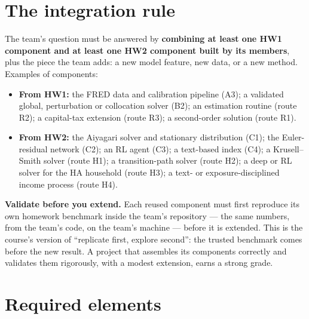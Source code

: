 \documentclass[11pt]{article}
\begin{document}
\section{The integration rule}

The team's question must be answered by \textbf{combining at least one HW1 component and at least
one HW2 component built by its members}, plus the piece the team adds: a new model feature, new
data, or a new method. Examples of components:
\begin{itemize}[leftmargin=*,itemsep=1pt]
  \item \textbf{From HW1:} the FRED data and calibration pipeline (A3); a validated global,
        perturbation or collocation solver (B2); an estimation routine (route R2); a capital-tax
        extension (route R3); a second-order solution (route R1).
  \item \textbf{From HW2:} the Aiyagari solver and stationary distribution (C1); the Euler-residual
        network (C2); an RL agent (C3); a text-based index (C4); a Krusell--Smith solver (route H1);
        a transition-path solver (route H2); a deep or RL solver for the HA household (route H3); a
        text- or exposure-disciplined income process (route H4).
\end{itemize}

\textbf{Validate before you extend.} Each reused component must first reproduce its own homework
benchmark inside the team's repository --- the same numbers, from the team's code, on the team's
machine --- before it is extended. This is the course's version of ``replicate first, explore
second'': the trusted benchmark comes before the new result. A project that assembles its
components correctly and validates them rigorously, with a modest extension, earns a strong grade.

\section{Required elements}
\end{document}
